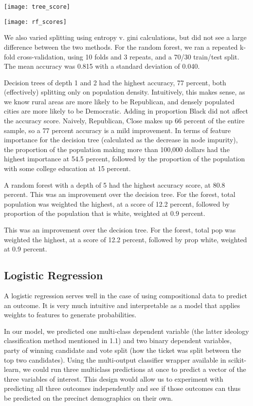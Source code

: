 \documentclass{article}
\begin{document}
\begin{itemize}
\texttt{[image: tree\_score]}

\texttt{[image: rf\_scores]}

We also varied splitting using entropy v. gini calculations, but did not see a large difference between the two methods. For the random forest, we ran a repeated k-fold cross-validation, using 10 folds and 3 repeats, and a 70/30 train/test split. The mean accuracy was 0.815 with a standard deviation of 0.040.

Decision trees of depth 1 and 2 had the highest accuracy, 77 percent, both (effectively) splitting only on population density. Intuitively, this makes sense, as we know rural areas are more likely to be Republican, and densely populated cities are more likely to be Democratic. Adding in proportion Black did not affect the accuracy score. Naively, Republican, Close makes up 66 percent of the entire sample, so a 77 percent accuracy is a mild improvement. In terms of feature importance for the decision tree (calculated as the decrease in node impurity), the proportion of the population making more than 100,000 dollars had the highest importance at 54.5 percent, followed by the proportion of the population with some college education at 15 percent.

A random forest with a depth of 5 had the highest accuracy score, at 80.8 percent. This was an improvement over the decision tree. For the forest, total population was weighted the highest, at a score of 12.2 percent, followed by proportion of the population that is white, weighted at 0.9 percent.

This was an improvement over the decision tree. For the forest, total pop was 
weighted the highest, at a score of 12.2 percent, followed by prop white, 
weighted at 0.9 percent. 



\subsection{Logistic Regression}

A logistic regression serves well in the case of using compositional data to predict an outcome. It is very much intuitive and interpretable as a model that applies weights to features to generate probabilities.

In our model, we predicted one multi-class dependent variable (the latter ideology classification method mentioned in 1.1) and two binary dependent variables, party of winning candidate and vote split (how the ticket was split between the top two candidates). Using the multi-output classifier wrapper available in scikit-learn, we could run three multiclass predictions at once to predict a vector of the three variables of interest. This design would allow us to experiment with predicting all three outcomes independently and see if those outcomes can thus be predicted on the precinct demographics on their own. 


\end{itemize}
\end{document}
